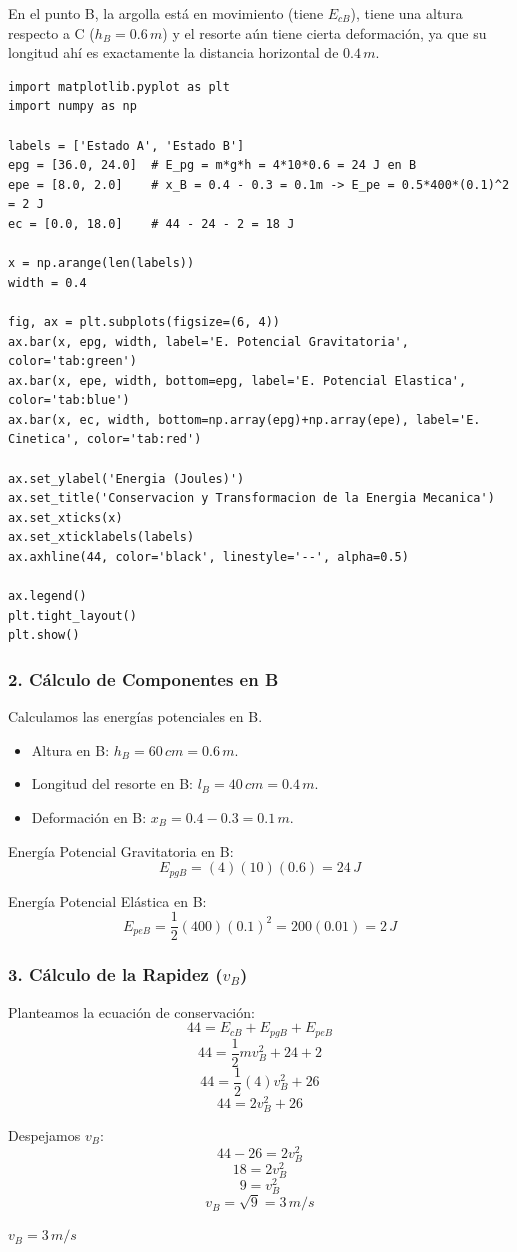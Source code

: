 \documentclass[12pt, a4paper]{article}
\begin{document}
En el punto B, la argolla está en movimiento (tiene $E_{cB}$), tiene una altura respecto a C ($h_B = 0.6 \, \si{m}$) y el resorte aún tiene cierta deformación, ya que su longitud ahí es exactamente la distancia horizontal de $0.4 \, \si{m}$.

\begin{lstlisting}
import matplotlib.pyplot as plt
import numpy as np

labels = ['Estado A', 'Estado B']
epg = [36.0, 24.0]  # E_pg = m*g*h = 4*10*0.6 = 24 J en B
epe = [8.0, 2.0]    # x_B = 0.4 - 0.3 = 0.1m -> E_pe = 0.5*400*(0.1)^2 = 2 J
ec = [0.0, 18.0]    # 44 - 24 - 2 = 18 J

x = np.arange(len(labels))
width = 0.4

fig, ax = plt.subplots(figsize=(6, 4))
ax.bar(x, epg, width, label='E. Potencial Gravitatoria', color='tab:green')
ax.bar(x, epe, width, bottom=epg, label='E. Potencial Elastica', color='tab:blue')
ax.bar(x, ec, width, bottom=np.array(epg)+np.array(epe), label='E. Cinetica', color='tab:red')

ax.set_ylabel('Energia (Joules)')
ax.set_title('Conservacion y Transformacion de la Energia Mecanica')
ax.set_xticks(x)
ax.set_xticklabels(labels)
ax.axhline(44, color='black', linestyle='--', alpha=0.5)

ax.legend()
plt.tight_layout()
plt.show()
\end{lstlisting}

\subsubsection*{2. Cálculo de Componentes en B}
Calculamos las energías potenciales en B.
\begin{itemize}
    \item Altura en B: $h_B = 60 \, \si{cm} = 0.6 \, \si{m}$.
    \item Longitud del resorte en B: $l_B = 40 \, \si{cm} = 0.4 \, \si{m}$.
    \item Deformación en B: $x_B = 0.4 - 0.3 = 0.1 \, \si{m}$.
\end{itemize}

Energía Potencial Gravitatoria en B:
$$ E_{pgB} = (4)(10)(0.6) = 24 \, \si{J} $$

Energía Potencial Elástica en B:
$$ E_{peB} = \frac{1}{2} (400) (0.1)^2 = 200(0.01) = 2 \, \si{J} $$

\subsubsection*{3. Cálculo de la Rapidez ($v_B$)}
Planteamos la ecuación de conservación:
$$ 44 = E_{cB} + E_{pgB} + E_{peB} $$
$$ 44 = \frac{1}{2} m v_B^2 + 24 + 2 $$
$$ 44 = \frac{1}{2} (4) v_B^2 + 26 $$
$$ 44 = 2 v_B^2 + 26 $$

Despejamos $v_B$:
$$ 44 - 26 = 2 v_B^2 $$
$$ 18 = 2 v_B^2 $$
$$ 9 = v_B^2 $$
$$ v_B = \sqrt{9} = 3 \, \si{m/s} $$

\begin{tcolorbox}[colback=green!5!white, colframe=green!50!black, title=Respuesta Final]
\centering \Large $v_B = 3 \, \si{m/s}$
\end{tcolorbox}
\end{document}
